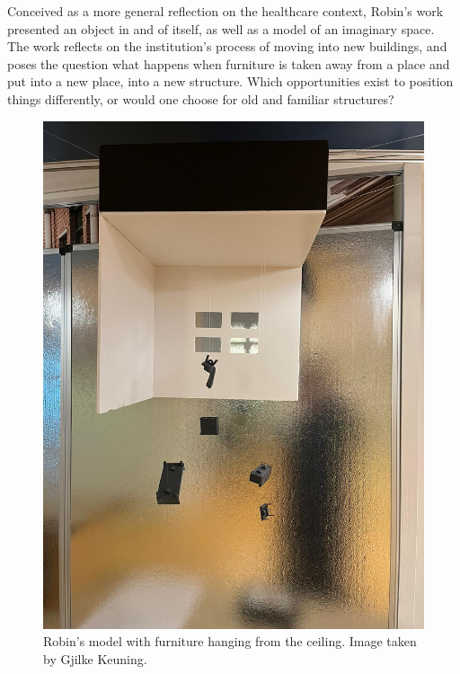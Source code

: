 \documentclass[authordate, empirical]{jote-new-article}
\begin{document}
	Conceived as a more general reflection on the healthcare context, Robin's work presented an object in and of itself, as well as a model of an imaginary space. The work reflects on the institution's process of moving into new buildings, and poses the question what happens when furniture is taken away from a place and put into a new place, into a new structure. Which opportunities exist to position things differently, or would one choose for old and familiar structures?







	\begin{figure}
		\includegraphics[width=\linewidth]{media/fig+4.jpeg}

		\caption{Robin's model with furniture hanging from the ceiling. Image taken by Gjilke Keuning.}



	\end{figure}
\end{document}
